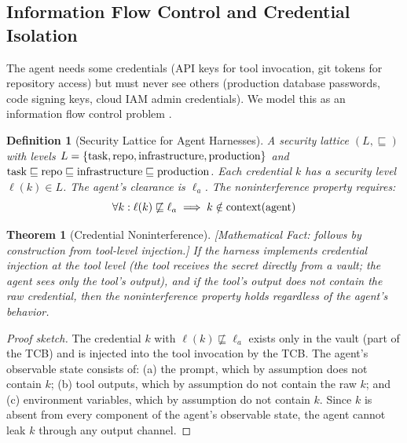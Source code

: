 \documentclass[11pt, a4paper]{googledeepmind}
\newtheorem{definition}{Definition}[section]
\newtheorem{theorem}{Theorem}[section]
\begin{document}
\subsection{Information Flow Control and Credential Isolation}

The agent needs some credentials (API keys for tool invocation, git tokens for repository access) but must never see others (production database passwords, code signing keys, cloud IAM admin credentials). We model this as an information flow control problem \citep{denning1976lattice}.

\begin{definition}[Security Lattice for Agent Harnesses]
\label{def:sec-lattice}
A security lattice $(L, \sqsubseteq)$ with levels $L = \{\textup{task}, \textup{repo}, \textup{infrastructure}, \textup{production}\}$ and $\textup{task} \sqsubseteq \textup{repo} \sqsubseteq \textup{infrastructure} \sqsubseteq \textup{production}$. Each credential $k$ has a security level $\ell(k) \in L$. The agent's clearance is $\ell_a$. The noninterference property requires:
\begin{equation}
\forall k: \ell(k) \not\sqsubseteq \ell_a \implies k \notin \textup{context}(\textup{agent})
\end{equation}
\end{definition}

\begin{theorem}[Credential Noninterference]
\emph{[Mathematical Fact: follows by construction from tool-level injection.]}
\label{thm:noninterference-sec}
If the harness implements credential injection at the tool level (the tool receives the secret directly from a vault; the agent sees only the tool's output), and if the tool's output does not contain the raw credential, then the noninterference property holds regardless of the agent's behavior.
\end{theorem}

\begin{proof}[Proof sketch]
The credential $k$ with $\ell(k) \not\sqsubseteq \ell_a$ exists only in the vault (part of the TCB) and is injected into the tool invocation by the TCB. The agent's observable state consists of: (a) the prompt, which by assumption does not contain $k$; (b) tool outputs, which by assumption do not contain the raw $k$; and (c) environment variables, which by assumption do not contain $k$. Since $k$ is absent from every component of the agent's observable state, the agent cannot leak $k$ through any output channel.
\end{proof}
\end{document}
